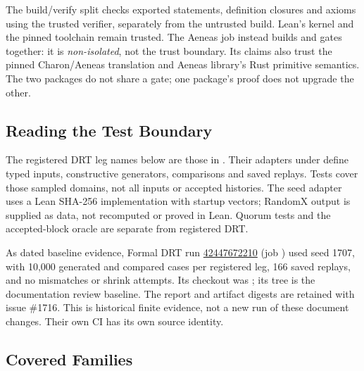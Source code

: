 The  build/verify split checks exported statements,
definition closures and axioms using the trusted verifier, separately from
the untrusted build. Lean's kernel and the pinned toolchain remain trusted.
The Aeneas  job instead builds and gates together: it is
\emph{non-isolated}, not the  trust boundary. Its claims
also trust the pinned Charon/Aeneas translation and Aeneas library's Rust
primitive semantics. The two packages do not share a gate; one package's
proof does not upgrade the other.

\subsection{Reading the Test Boundary}

The registered DRT leg names below are those in
. Their adapters under 
define typed inputs, constructive generators, comparisons and saved replays.
Tests cover those sampled domains, not all inputs or accepted histories.
The seed adapter uses a Lean SHA-256 implementation with startup vectors;
RandomX output is supplied as data, not recomputed or proved in Lean.
Quorum tests and the accepted-block oracle are separate from registered DRT.

As dated baseline evidence, Formal DRT run
\href{https://github.com/botho-project/botho/actions/runs/42447672210}{42447672210}
(job ) used seed 1707, with 10,000 generated and compared
cases per registered leg, 166 saved replays, and no mismatches or shrink
attempts. Its checkout was ;
its tree  is the documentation
review baseline. The report and artifact digests are retained with issue
\#1716. This is historical finite evidence, not a new run of these document
changes. Their own CI has its own source identity.

\subsection{Covered Families}

